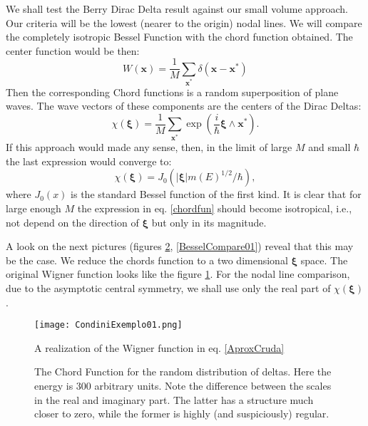 \documentclass[a4paper,12pt]{article}
\newcommand{\ihb}{\frac{i}{\hbar}}
\newcommand{\xfase}{\mathbf{x}}
\newcommand{\xifase}{ {\boldsymbol{\xi}} }
\begin{document}
We shall test the Berry Dirac Delta result \cite{BerryRIR} 
against our 
small volume approach. Our criteria will be the lowest
(nearer to the origin) nodal lines. We will compare
the completely isotropic Bessel Function with the
chord function obtained. The center function would be then:
\begin{equation}\label{AproxCruda}
W(\xfase)=\frac{1}{M}\sum_{\xfase^*} \delta (\xfase - \xfase^*)
\end{equation}
Then the corresponding Chord functions is a random superposition
of plane waves. The wave vectors of these components are
the centers of the Dirac Deltas:
\begin{equation}\label{chordfun}
\chi(\xifase)=\frac{1}{M}\sum_{\xfase^*} \exp \left( \ihb \xifase\wedge\xfase^* \right).
\end{equation}
If this approach would made any sense,
then, in the limit of large $M$ and small $\hbar$
the last expression would converge to:
\begin{equation}\label{BerryApproach}
\chi(\xifase)=J_0(|\xifase|m(E)^{1/2}/\hbar),
\end{equation}
where $J_0(x)$ is the standard Bessel function of the first kind.  
It is clear that for large enough $M$ the expression 
in eq. \ref{chordfun} should become
isotropical, i.e., not depend on the direction of $\xifase$ but
only in its magnitude. 

A look on the next pictures (figures \ref{XiFunction01},
\ref{BesselCompare01})
reveal that this may be the case. 
We reduce  the chords function
to a two dimensional $\xifase$ space. The original 
Wigner function looks like the figure \ref{WigExample}.
For the nodal line comparison, due to
the asymptotic central symmetry, we shall use only the 
real part of $\chi(\xifase)$.


\begin{figure}
\begin{center}
  \texttt{[image: CondiniExemplo01.png]}
\caption{ A realization of the Wigner
function in eq. \ref{AproxCruda}}\label{WigExample}
\end{center}
\end{figure}

\begin{figure}
\begin{center}
\caption{The Chord Function for the random distribution of deltas. 
Here the energy is $300$ arbitrary units. Note the difference between
the scales in the real and imaginary part. The latter has a structure much
closer to zero, while the former is highly (and suspiciously) regular.}
\label{XiFunction01}
\end{center}
\end{figure}
\end{document}
